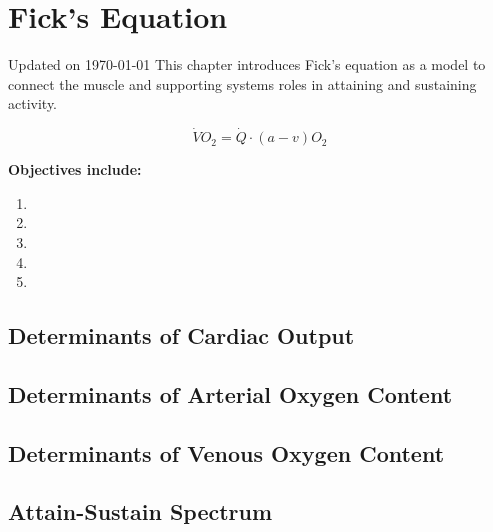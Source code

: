 \chapter{Fick's Equation}\label{chp:fick_equation}
Updated on \today
\minitoc
This chapter introduces Fick's equation as a model to connect the muscle and supporting systems roles in attaining and sustaining activity.


\begin{equation}
    \dot{V}O_2 = \dot{Q} \cdot (a-v)O_2
\end{equation}

\vspace{5mm}

\textbf{Objectives include:}
\begin{enumerate}
    \item
    \item
    \item
    \item
    \item
\end{enumerate}

\section{Determinants of Cardiac Output}

\section{Determinants of Arterial Oxygen Content}

\section{Determinants of Venous Oxygen Content}

\section{Attain-Sustain Spectrum}

\printbibliography[heading=subbibintoc]